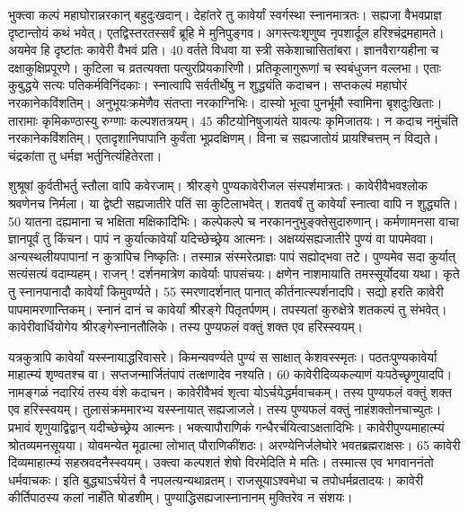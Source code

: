 भुक्त्वा कल्पं महाघोरान्नरकान् बहुदुःखदान्।
 देहांतरे तु कावेर्यां स्वर्गस्था स्नानमात्रतः।
 सह्यजा वैभवप्राज्ञ दृष्टान्तोयं कथं भवेत्।
 एतद्विस्तरतस्सर्वं ब्रूहि मे मुनिपुङ्गव।
 अगस्त्यःशृणुष्व नृपशार्दूल हरिश्चंद्रमहामते।
 अयमेव हि दृष्टांतः कावेरी वैभवं प्रति।
 40 वर्तते विधवा या स्त्री सकेशाचासितांबरा।
 ज्ञानवैराग्यहीना च दक्षाकुक्षिप्रपूरणे।
 कुटिला च व्रतत्यक्ता पत्युरप्रियकारिणी।
 प्रतिकूलागुरूणां च स्वबंधुजन वल्लभा।
 एताः कुबुद्धये सत्यः पतिकर्मविनिंदकाः।
 स्नात्वापि सर्वतीर्थेषु न शुद्ध्यंति कदाचन।
 सप्तकल्पं महाघोरं नरकानेकविंशतिम्।
 अनुभूयःक्रमेणैव संतप्ता नरकाग्निभिः।
 दास्यो भूत्वा पुनर्भूमौ स्वामिना बृशदुःखिताः।
 तारामाः कृमिकण्ठास्यु रुग्णाः कल्पशतत्रयम्।
 45 कीटयोनिषुजायंते यावत्यः कृमिजातयः।
 न कदाच नमुंचंति नरकानेकविंशतिम्।
 एतादृशानिपापानि कुर्वंता भूप्रदक्षिणम्।
 विना च सह्यजातोयं प्रायश्चित्तम् न विद्यते।
 चंद्रकांता तु धर्मज्ञ भर्तुनित्यंहितेरता।
 
शुश्रूषां कुर्वतीभर्तु स्तौला वापि कवेरजाम्।
 श्रीरङ्गे पुण्यकावेरीजल संस्पर्शमात्रतः।
 कावेरीवैभवश्लोक श्रवणेनच निर्मला।
 या द्वेष्टी सह्यजातीरे पतिं सा कुटिलाभवेत्।
 शतवर्षं तु कावेर्यां स्नात्वा वापि न शुद्ध्यति।
 50 यातना दह्यमाना च भक्षिता मक्षिकादिभिः।
 कल्पेकल्पे च नरकाननुभुङ्क्तेसुदारुणान्।
 कर्मणामनसा वाचा ज्ञानपूर्वं तु किंचन।
 पापं न कुर्यात्कावेर्यां यदिच्छेच्छ्रेय आत्मनः।
 अक्षय्यंसह्यजातीरे पुण्यं वा पापमेववा।
 अन्यस्थलीयपापानां न कुत्रापिच निष्कृतिः।
 तस्मान्न संस्मरेत्प्राज्ञः पापं सह्योद्भवा तटे।
 पुण्यमेव सदा कुर्यात् सत्यंसत्यं वदाम्यहम्।
 राजन् ! दर्शनमात्रेण कावेर्याः पापसंचयः।
 क्षणेन नाशमायाति तमस्सूर्योदया यथा।
 कृते तु स्नानपानादौ कावेर्यां किमुवर्ण्यते।
 55 स्मरणादर्शनात् पानात् कीर्तनात्स्पर्शनादपि।
 सद्यो हरति कावेरी पापमामरणान्तिकम्।
 स्नानं दानं च कावेर्यां श्रीरङ्गे पितृतर्पणम्।
 तपस्यतां कुरुक्षेत्रे शतकल्पं तु संभवेत्।
 कावेरीवार्धियोगेय श्रीरङ्गेस्नानतौलिके।
 तस्य पुण्यफलं वक्तुं शक्त एव हरिस्स्वयम्।
 
यत्रकुत्रापि कावेर्यां यस्स्नायाद्धरिवासरे।
 किमन्यवर्ण्यते पुण्यं स साक्षात् केशवस्स्मृतः।
 पठतःपुण्यकावेर्या माहात्म्यं शृण्वतश्च वा।
 सप्तजन्मार्जितंपापं तत्क्षणादेव नश्यति।
 60 कावेरीदिव्यकल्याणं यःपठेच्छृणुयादपि।
 नामङ्गळं नदारियं तस्य वंशे कदाचन।
 कावेरीवैभवं शृत्वा योऽर्चयेद्धर्मवाचकम्।
 तस्य पुण्यफलं वक्तुं शक्त एव हरिस्स्वयम्।
 तुलासंक्रममारभ्य यस्स्नायात् सह्यजाजले।
 तस्य पुण्यफलं वक्तुं नाहंशक्तोनचाच्युतः।
 प्रभावं शृणुयाद्विद्वान् यदीच्छेच्छ्रेय आत्मनः।
 भक्त्यापौराणिकं गन्धैरर्चयित्वाऽक्षतादिभिः।
 कावेरीपुण्यमाहात्म्यं श्रोतव्यमनसूयया।
 योवमन्येत मूढात्मा लोभात् पौराणिकींशठः।
 अरण्येनिर्जलेघोरे भवतब्रह्मराक्षसः।
 65 कावेरी दिव्यमाहात्म्यं सहस्रवदनैस्स्वयम्।
 उक्त्वा कल्पशतं शेषो विरमेदिति मे मतिः।
 तस्मात्स एव भगवाननंतो धर्मवाचकः।
 इति बुद्ध्याऽर्चयेत्तं वै नपलत्यन्यथाव्रतम्।
 राजसूयाऽश्वमेधा च तपोधर्मव्रतादयः।
 कावेरी कीर्तिपाठस्य कलां नाहँति षोडशीम्।
 पुण्याद्धिसह्यजास्नानानम् मुक्तिरेव न संशयः।
 

